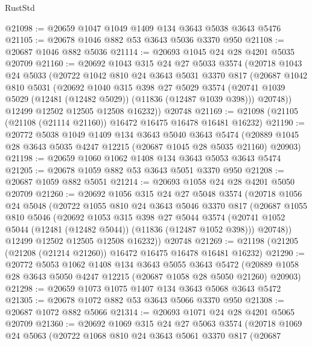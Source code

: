 \begin{lexlean}{RustStd}
\begin{coremodule}
@21098 := @20659 @1047 @1049 @1409 @134 @3643 @5038 @3643 @5476
@21105 := @20678 @1046 @882 @53 @3643 @5036 @3370 @950
@21108 := @20687 @1046 @882 @5036
@21114 := @20693 @1045 @24 @28 @4201 @5035 @20709
@21160 := @20692
    @1043
    @315
    @24
    @27
    @5033
    @3574
    (@20718
      @1043
      @24
      @5033
      (@20722
        @1042
        @810
        @24
        @3643
        @5031
        @3370
        @817
        (@20687
          @1042
          @810
          @5031
          (@20692
            @1040
            @315
            @398
            @27
            @5029
            @3574
            (@20741 @1039 @5029 (@12481 (@12482 @5029)) (@11836 (@12487 @1039 @398)))
            @20748))
        @12499
        @12502
        @12505
        @12508
        @16232))
    @20748
@21169 := @21098 (@21105 (@21108 (@21114 @21160)) @16472 @16475 @16478 @16481 @16232)
@21190 := @20772
    @5038
    @1049
    @1409
    @134
    @3643
    @5040
    @3643
    @5474
    (@20889 @1045 @28 @3643 @5035 @4247 @12215 (@20687 @1045 @28 @5035 @21160) @20903)
@21198 := @20659 @1060 @1062 @1408 @134 @3643 @5053 @3643 @5474
@21205 := @20678 @1059 @882 @53 @3643 @5051 @3370 @950
@21208 := @20687 @1059 @882 @5051
@21214 := @20693 @1058 @24 @28 @4201 @5050 @20709
@21260 := @20692
    @1056
    @315
    @24
    @27
    @5048
    @3574
    (@20718
      @1056
      @24
      @5048
      (@20722
        @1055
        @810
        @24
        @3643
        @5046
        @3370
        @817
        (@20687
          @1055
          @810
          @5046
          (@20692
            @1053
            @315
            @398
            @27
            @5044
            @3574
            (@20741 @1052 @5044 (@12481 (@12482 @5044)) (@11836 (@12487 @1052 @398)))
            @20748))
        @12499
        @12502
        @12505
        @12508
        @16232))
    @20748
@21269 := @21198 (@21205 (@21208 (@21214 @21260)) @16472 @16475 @16478 @16481 @16232)
@21290 := @20772
    @5053
    @1062
    @1408
    @134
    @3643
    @5055
    @3643
    @5472
    (@20889 @1058 @28 @3643 @5050 @4247 @12215 (@20687 @1058 @28 @5050 @21260) @20903)
@21298 := @20659 @1073 @1075 @1407 @134 @3643 @5068 @3643 @5472
@21305 := @20678 @1072 @882 @53 @3643 @5066 @3370 @950
@21308 := @20687 @1072 @882 @5066
@21314 := @20693 @1071 @24 @28 @4201 @5065 @20709
@21360 := @20692
    @1069
    @315
    @24
    @27
    @5063
    @3574
    (@20718
      @1069
      @24
      @5063
      (@20722
        @1068
        @810
        @24
        @3643
        @5061
        @3370
        @817
        (@20687

\end{coremodule}
\end{lexlean}
